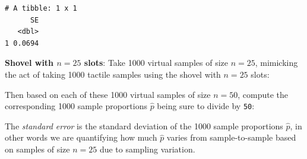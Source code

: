 \documentclass[12pt,]{krantz}
\makeatletter
\newenvironment{Shaded}{\begin{snugshade}}{\end{snugshade}}
\newcommand{\KeywordTok}[1]{\textcolor[rgb]{0.27,0.27,0.27}{\textbf{#1}}}
\newcommand{\DataTypeTok}[1]{\textcolor[rgb]{0.27,0.27,0.27}{#1}}
\newcommand{\DecValTok}[1]{\textcolor[rgb]{0.06,0.06,0.06}{#1}}
\newcommand{\StringTok}[1]{\textcolor[rgb]{0.5,0.5,0.5}{#1}}
\newcommand{\OperatorTok}[1]{\textcolor[rgb]{0.43,0.43,0.43}{\textbf{#1}}}
\newcommand{\NormalTok}[1]{#1}
\newenvironment{kframe}{%
\medskip{}
\setlength{\fboxsep}{.8em}
 \def\at@end@of@kframe{}%
 \ifinner\ifhmode%
  \def\at@end@of@kframe{\end{minipage}}%
  \begin{minipage}{\columnwidth}%
 \fi\fi%
 \def\FrameCommand##1{\hskip\@totalleftmargin \hskip-\fboxsep
 \colorbox{shadecolor}{##1}\hskip-\fboxsep
     \hskip-\linewidth \hskip-\@totalleftmargin \hskip\columnwidth}%
 \MakeFramed {\advance\hsize-\width
   \@totalleftmargin\z@ \linewidth\hsize
   \@setminipage}}%
 {\par\unskip\endMakeFramed%
 \at@end@of@kframe}
\renewenvironment{Shaded}{\begin{kframe}}{\end{kframe}}
\theoremstyle{definition}
\theoremstyle{definition}
\theoremstyle{definition}
\theoremstyle{remark}
\makeatother
\begin{document}
\begin{verbatim}
# A tibble: 1 x 1
      SE
   <dbl>
1 0.0694
\end{verbatim}

\textbf{Shovel with \(n=25\) slots}: Take 1000 virtual samples of size
\(n=25\), mimicking the act of taking 1000 tactile samples using the
shovel with \(n=25\) slots:

\begin{Shaded}
\end{Shaded}

Then based on each of these 1000 virtual samples of size \(n=50\),
compute the corresponding 1000 sample proportions \(\widehat{p}\) being
sure to divide by \texttt{50}:

\begin{Shaded}
\end{Shaded}

The \emph{standard error} is the standard deviation of the 1000 sample
proportions \(\widehat{p}\), in other words we are quantifying how much
\(\widehat{p}\) varies from sample-to-sample based on samples of size
\(n=25\) due to sampling variation.

\begin{Shaded}
\end{Shaded}
\end{document}
